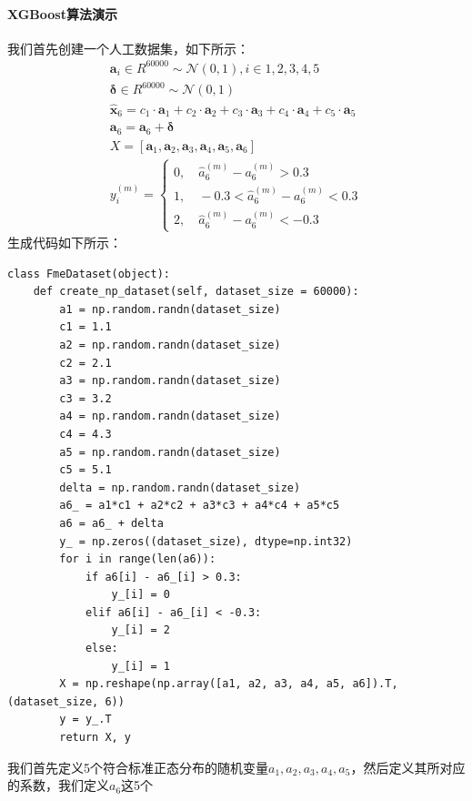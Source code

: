 \documentclass{article}
\begin{document}
\paragraph{XGBoost算法演示}
我们首先创建一个人工数据集，如下所示：
\begin{equation}
\begin{aligned}
\boldsymbol{a}_i \in R^{60000} \sim \mathcal{N}(0, 1), i \in {1, 2, 3, 4, 5} \\
\boldsymbol{\delta} \in R^{60000} \sim \mathcal{N}(0, 1) \\
\hat{\boldsymbol{x}}_6 = c_1 \cdot \boldsymbol{a}_1 + c_2 \cdot \boldsymbol{a}_2 + 
c_3 \cdot \boldsymbol{a}_3 + c_4 \cdot \boldsymbol{a}_4 + c_5 \cdot \boldsymbol{a}_5 \\
\boldsymbol{a}_6 = \boldsymbol{a}_6 + \boldsymbol{\delta} \\
X = [\boldsymbol{a}_1, \boldsymbol{a}_2, \boldsymbol{a}_3, \boldsymbol{a}_4, 
    \boldsymbol{a}_5, \boldsymbol{a}_6] \\
y^{(m)}_{i} = \begin{cases}
    0, \quad \hat{a}^{(m)}_6 - a^{(m)}_6 > 0.3 \\
    1, \quad -0.3 < \hat{a}^{(m)}_6 - a^{(m)}_6 < 0.3 \\
    2, \quad \hat{a}^{(m)}_6 - a^{(m)}_6 < -0.3
\end{cases}
\end{aligned}
\label{e000122}
\end{equation}
生成代码如下所示：
\begin{lstlisting}
class FmeDataset(object):
    def create_np_dataset(self, dataset_size = 60000):
        a1 = np.random.randn(dataset_size)
        c1 = 1.1
        a2 = np.random.randn(dataset_size)
        c2 = 2.1
        a3 = np.random.randn(dataset_size)
        c3 = 3.2
        a4 = np.random.randn(dataset_size)
        c4 = 4.3
        a5 = np.random.randn(dataset_size)
        c5 = 5.1
        delta = np.random.randn(dataset_size)
        a6_ = a1*c1 + a2*c2 + a3*c3 + a4*c4 + a5*c5
        a6 = a6_ + delta
        y_ = np.zeros((dataset_size), dtype=np.int32)
        for i in range(len(a6)):
            if a6[i] - a6_[i] > 0.3:
                y_[i] = 0
            elif a6[i] - a6_[i] < -0.3:
                y_[i] = 2
            else:
                y_[i] = 1
        X = np.reshape(np.array([a1, a2, a3, a4, a5, a6]).T, (dataset_size, 6))
        y = y_.T
        return X, y
\end{lstlisting}
我们首先定义5个符合标准正态分布的随机变量$a_1, a_2, a_3, a_4, a_5$，然后定义其所对应的系数，我们定义$a_6$这5个
\end{document}
